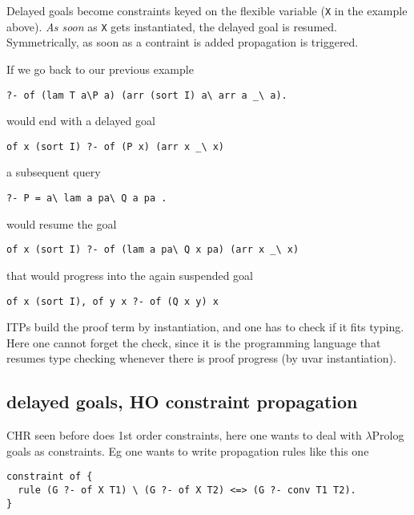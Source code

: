 \documentclass{easychair}
\begin{document}
Delayed goals become constraints keyed on the flexible variable
(\verb+X+ in the example above).  \emph{As soon} as \verb+X+ gets
instantiated, the delayed goal is resumed.  Symmetrically, as soon
as a contraint is added propagation is triggered.

If we go back to our previous example

\begin{verbatim}
?- of (lam T a\P a) (arr (sort I) a\ arr a _\ a).
\end{verbatim}

would end with a delayed goal

\begin{verbatim}
of x (sort I) ?- of (P x) (arr x _\ x)
\end{verbatim}

a subsequent query

\begin{verbatim}
?- P = a\ lam a pa\ Q a pa .
\end{verbatim}

would resume the goal

\begin{verbatim}
of x (sort I) ?- of (lam a pa\ Q x pa) (arr x _\ x)
\end{verbatim}

that would progress into the again suspended goal

\begin{verbatim}
of x (sort I), of y x ?- of (Q x y) x
\end{verbatim}

ITPs build the proof term by instantiation, and one has to check
if it fits typing.  Here one cannot forget the check, since it is
the programming language that resumes type checking whenever there is
proof progress (by uvar instantiation).

\subsection{delayed goals, HO constraint propagation}

CHR seen before does 1st order constraints, here one wants to deal
with $\lambda$Prolog goals as constraints.  Eg one wants to write  propagation
rules like this one

\begin{verbatim}
constraint of {
  rule (G ?- of X T1) \ (G ?- of X T2) <=> (G ?- conv T1 T2).
}
\end{verbatim}
\end{document}
